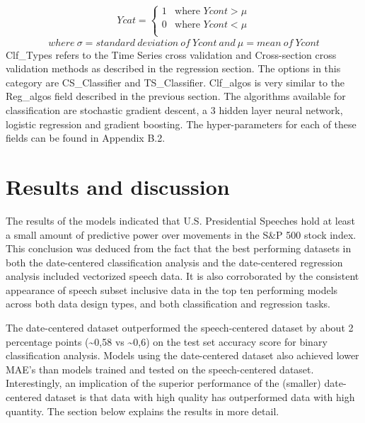 \documentclass[11pt,preprint, authoryear]{elsarticle}
\numberwithin{equation}{section}
\numberwithin{figure}{section}
\numberwithin{table}{section}
\begin{document}
\begin{align}
Ycat=   \left\{ 
\begin{array}{ll} 
      1  &\text{where } Ycont>\mu \label{eq2} \\
      0  &\text{where } Ycont<\mu \\
\end{array} 
\right. 
\end{align} \[
where \ \sigma = standard \ deviation \ of \ Ycont \ and \ \mu = mean \ of \ Ycont
\] Clf\_Types refers to the Time Series cross validation and
Cross-section cross validation methods as described in the regression
section. The options in this category are CS\_Classifier and
TS\_Classifier. Clf\_algos is very similar to the Reg\_algos field
described in the previous section. The algorithms available for
classification are stochastic gradient descent, a 3 hidden layer neural
network, logistic regression and gradient boosting. The hyper-parameters
for each of these fields can be found in Appendix B.2.

\hypertarget{results-and-discussion}{%
\section{\texorpdfstring{Results and discussion
\label{results}}{Results and discussion }}\label{results-and-discussion}}

The results of the models indicated that U.S. Presidential Speeches hold
at least a small amount of predictive power over movements in the S\&P
500 stock index. This conclusion was deduced from the fact that the best
performing datasets in both the date-centered classification analysis
and the date-centered regression analysis included vectorized speech
data. It is also corroborated by the consistent appearance of speech
subset inclusive data in the top ten performing models across both data
design types, and both classification and regression tasks.

The date-centered dataset outperformed the speech-centered dataset by
about 2 percentage points (\textasciitilde0,58 vs \textasciitilde0,6) on
the test set accuracy score for binary classification analysis. Models
using the date-centered dataset also achieved lower MAE's than models
trained and tested on the speech-centered dataset. Interestingly, an
implication of the superior performance of the (smaller) date-centered
dataset is that data with high quality has outperformed data with high
quantity. The section below explains the results in more detail.
\end{document}
